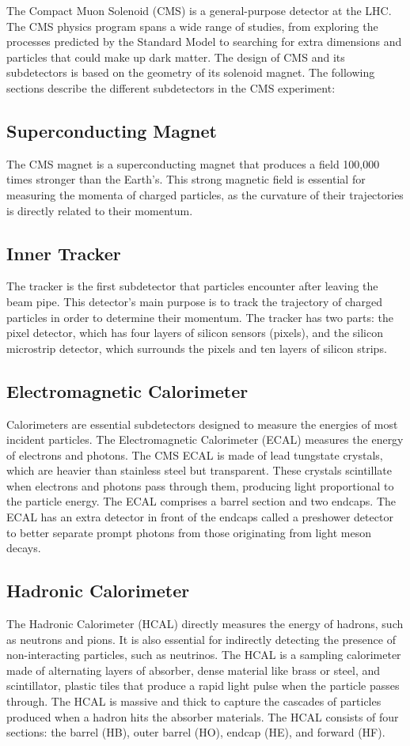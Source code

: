 The Compact Muon Solenoid (CMS) is a general-purpose detector at the LHC.
The CMS physics program spans a wide range of studies, from exploring the processes predicted by the Standard Model to searching for extra dimensions
and particles that could make up dark matter. The design of CMS and its subdetectors is based on the geometry of its solenoid magnet.
The following sections describe the different subdetectors in the CMS experiment:

\subsection{Superconducting Magnet}
The CMS magnet is a superconducting magnet that produces a field 100,000 times stronger than the Earth's.
This strong magnetic field is essential for measuring the momenta of charged particles, as the curvature of their trajectories is directly related to their momentum.

\subsection{Inner Tracker}
The tracker is the first subdetector that particles encounter after leaving the beam pipe.
This detector's main purpose is to track the trajectory of charged particles in order to determine their momentum.
The tracker has two parts: the pixel detector, which has four layers of silicon sensors (pixels), and the silicon microstrip detector,
which surrounds the pixels and ten layers of silicon strips.

\subsection{Electromagnetic Calorimeter}
Calorimeters are essential subdetectors designed to measure the energies of most incident particles.
The Electromagnetic Calorimeter (ECAL) measures the energy of electrons and photons.
The CMS ECAL is made of lead tungstate crystals, which are heavier than stainless steel but transparent.
These crystals scintillate when electrons and photons pass through them, producing light proportional to the particle energy.
The ECAL comprises a barrel section and two endcaps.
The ECAL has an extra detector in front of the endcaps called a preshower detector to better separate prompt photons from those originating from light meson decays.

\subsection{Hadronic Calorimeter}
The Hadronic Calorimeter (HCAL) directly measures the energy of hadrons, such as neutrons and pions.
It is also essential for indirectly detecting the presence of non-interacting particles, such as neutrinos.
The HCAL is a sampling calorimeter made of alternating layers of absorber, dense material like brass or steel,
and scintillator, plastic tiles that produce a rapid light pulse when the particle passes through.
The HCAL is massive and thick to capture the cascades of particles produced when a hadron hits the absorber materials.
The HCAL consists of four sections: the barrel (HB), outer barrel (HO), endcap (HE), and forward (HF).

